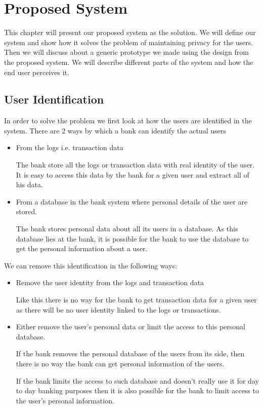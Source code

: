 \chapter{Proposed System}

This chapter will present our proposed system as the solution. We will define our system and show how it solves the problem of maintaining privacy for the users. Then we will discuss about a generic prototype we made using the design from the proposed system. We will describe different parts of the system and how the end user perceives it.
\section{User Identification}
In order to solve the problem we first look at how the users are identified in the system. There are 2 ways by which a bank can identify the actual users
\begin{itemize}
	\item From the logs i.e. transaction data
	
The bank store all the logs or transaction data with real identity of the user. It is easy to access this data by the bank for a given user and extract all of his data.
	\item From a database in the bank system where personal details of the user are stored.	

The bank stores personal data about all its users in a database. As this database lies at the bank, it is possible for the bank to use the database to get the personal information about a user.
\end{itemize}
We can remove this identification in the following ways:
\begin{itemize}
	\item Remove the user identity from the logs and transaction data

Like this there is no way for the bank to get transaction data for a given user as there will be no user identity linked to the logs or transactions.
	\item Either remove the user's personal data or limit the access to this personal database.

If the bank removes the personal database of the users from its side, then there is no way the bank can get personal information of the users.

If the bank limits the access to such database and doesn't really use it for day to day banking purposes then it is also possible for the bank to limit access to the user's personal information.
\end{itemize}
